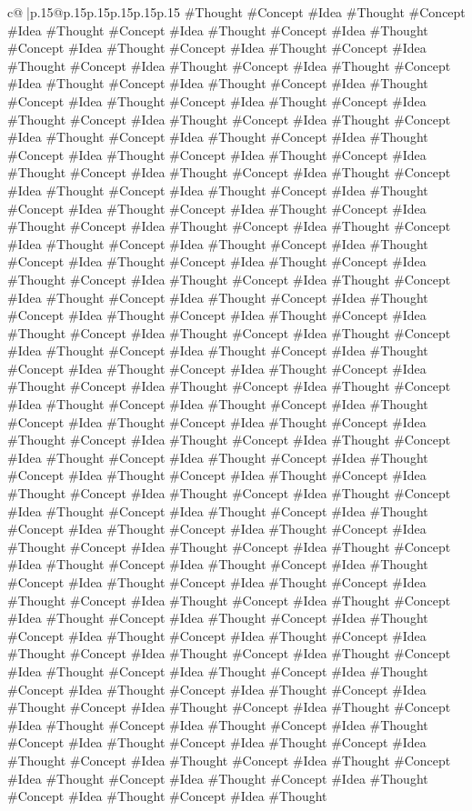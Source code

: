 \documentclass{article}
\begin{document}
{\begin{supertabular}{c@{$\;$}|p{.15\linewidth}@{}p{.15\linewidth}p{.15\linewidth}p{.15\linewidth}p{.15\linewidth}p{.15\linewidth}}
{{{\#Thought \#Concept \#Idea \#Thought \#Concept \#Idea \#Thought \#Concept \#Idea \#Thought \#Concept \#Idea \#Thought \#Concept \#Idea \#Thought \#Concept \#Idea \#Thought \#Concept \#Idea \#Thought \#Concept \#Idea \#Thought \#Concept \#Idea \#Thought \#Concept \#Idea \#Thought \#Concept \#Idea \#Thought \#Concept \#Idea \#Thought \#Concept \#Idea \#Thought \#Concept \#Idea \#Thought \#Concept \#Idea \#Thought \#Concept \#Idea \#Thought \#Concept \#Idea \#Thought \#Concept \#Idea \#Thought \#Concept \#Idea \#Thought \#Concept \#Idea \#Thought \#Concept \#Idea \#Thought \#Concept \#Idea \#Thought \#Concept \#Idea \#Thought \#Concept \#Idea \#Thought \#Concept \#Idea \#Thought \#Concept \#Idea \#Thought \#Concept \#Idea \#Thought \#Concept \#Idea \#Thought \#Concept \#Idea \#Thought \#Concept \#Idea \#Thought \#Concept \#Idea \#Thought \#Concept \#Idea \#Thought \#Concept \#Idea \#Thought \#Concept \#Idea \#Thought \#Concept \#Idea \#Thought \#Concept \#Idea \#Thought \#Concept \#Idea \#Thought \#Concept \#Idea \#Thought \#Concept \#Idea \#Thought \#Concept \#Idea \#Thought \#Concept \#Idea \#Thought \#Concept \#Idea \#Thought \#Concept \#Idea \#Thought \#Concept \#Idea \#Thought \#Concept \#Idea \#Thought \#Concept \#Idea \#Thought \#Concept \#Idea \#Thought \#Concept \#Idea \#Thought \#Concept \#Idea \#Thought \#Concept \#Idea \#Thought \#Concept \#Idea \#Thought \#Concept \#Idea \#Thought \#Concept \#Idea \#Thought \#Concept \#Idea \#Thought \#Concept \#Idea \#Thought \#Concept \#Idea \#Thought \#Concept \#Idea \#Thought \#Concept \#Idea \#Thought \#Concept \#Idea \#Thought \#Concept \#Idea \#Thought \#Concept \#Idea \#Thought \#Concept \#Idea \#Thought \#Concept \#Idea \#Thought \#Concept \#Idea \#Thought \#Concept \#Idea \#Thought \#Concept \#Idea \#Thought \#Concept \#Idea \#Thought \#Concept \#Idea \#Thought \#Concept \#Idea \#Thought \#Concept \#Idea \#Thought \#Concept \#Idea \#Thought \#Concept \#Idea \#Thought \#Concept \#Idea \#Thought \#Concept \#Idea \#Thought \#Concept \#Idea \#Thought \#Concept \#Idea \#Thought \#Concept \#Idea \#Thought \#Concept \#Idea \#Thought \#Concept \#Idea \#Thought \#Concept \#Idea \#Thought \#Concept \#Idea \#Thought \#Concept \#Idea \#Thought \#Concept \#Idea \#Thought \#Concept \#Idea \#Thought \#Concept \#Idea \#Thought \#Concept \#Idea \#Thought \#Concept \#Idea \#Thought \#Concept \#Idea \#Thought \#Concept \#Idea \#Thought \#Concept \#Idea \#Thought \#Concept \#Idea \#Thought \#Concept \#Idea \#Thought \#Concept \#Idea \#Thought \#Concept \#Idea \#Thought \#Concept \#Idea \#Thought \#Concept \#Idea \#Thought \#Concept \#Idea \#Thought \#Concept \#Idea \#Thought \#Concept \#Idea \#Thought \#Concept \#Idea \#Thought \#Concept \#Idea \#Thought \#Concept \#Idea \#Thought \#Concept \#Idea \#Thought \#Concept \#Idea \#Thought \#Concept \#Idea \#Thought \#Concept \#Idea \#Thought \#Concept \#Idea \#Thought \#Concept \#Idea \#Thought \#Concept \#Idea \#Thought \#Concept \#Idea \#Thought \#Concept \#Idea \#Thought \#Concept \#Idea \#Thought \#Concept \#Idea \#Thought \#Concept \#Idea \#Thought \#Concept \#Idea \#Thought \#Concept \#Idea \#Thought \#Concept \#Idea \#Thought \#Concept \#Idea \#Thought }}}
\end{supertabular}}
\end{document}

